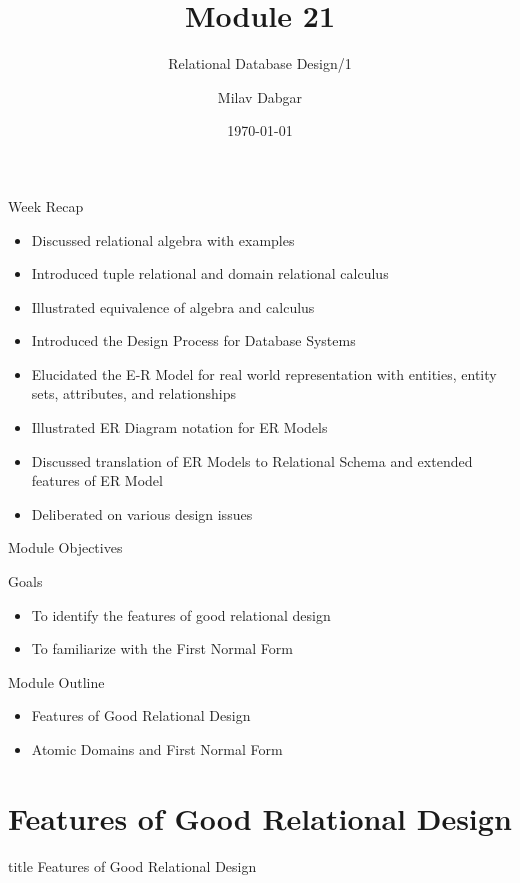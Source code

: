 \documentclass[aspectratio=169, xcolor=dvipsnames]{beamer}
\title{Module 21}
\subtitle{Relational Database Design/1}
\author{Milav Dabgar}
\institute{www.milav.in}
\date{\today}
\begin{document}
\begin{frame}
    \titlepage
\end{frame}

\begin{frame}{Week Recap}
    \begin{itemize}[<+->]
        \item Discussed relational algebra with examples
        \item Introduced tuple relational and domain relational calculus
        \item Illustrated equivalence of algebra and calculus
        \item Introduced the Design Process for Database Systems
        \item Elucidated the E-R Model for real world representation with entities, entity sets, attributes, and relationships
        \item Illustrated ER Diagram notation for ER Models
        \item Discussed translation of ER Models to Relational Schema and extended features of ER Model
        \item Deliberated on various design issues
    \end{itemize}
\end{frame}

\begin{frame}{Module Objectives}
    \begin{block}{Goals}
        \begin{itemize}[<+->]
            \item To identify the features of good relational design
            \item To familiarize with the First Normal Form
        \end{itemize}
    \end{block}
\end{frame}

\begin{frame}{Module Outline}
    \begin{itemize}[<+->]
        \item Features of Good Relational Design
        \item Atomic Domains and First Normal Form
    \end{itemize}
\end{frame}

\section{Features of Good Relational Design}
\begin{frame}
  \vfill
  \centering
  \begin{beamercolorbox}[sep=8pt,center,shadow=true,rounded=true]{title}
    Features of Good Relational Design\par%
  \end{beamercolorbox}
  \vfill
\end{frame}
\end{document}
